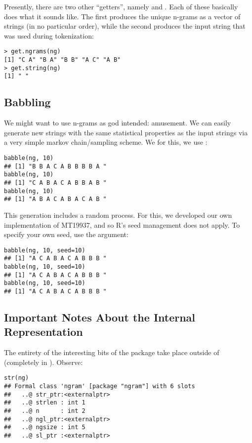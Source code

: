 Presently, there are two other ``getters'', namely  and
.  Each of these basically does what it sounds like.
The first produces the unique n-grams as a vector of strings (in no particular 
order), while the second produces the input string that was used during 
tokenization:

\begin{lstlisting}[language=rr]
> get.ngrams(ng)
[1] "C A" "B A" "B B" "A C" "A B"
> get.string(ng)
[1] " "
\end{lstlisting}




\subsection{Babbling}

We might want to use n-grams as god intended:  amusement.  We can easily
generate new strings with the same statistical properties as the input strings
via a very simple markov chain/sampling scheme.  We for this, we use 
:

\begin{lstlisting}[language=rr]
babble(ng, 10)
## [1] "B B A C A B B B B A "
babble(ng, 10)
## [1] "C A B A C A B B A B "
babble(ng, 10)
## [1] "A B A C A B A C A B "
\end{lstlisting}

This generation includes a random process.  For this, we developed our own
implementation of MT19937, and so R's seed management does not apply.  To 
specify your own seed, use the  argument:

\begin{lstlisting}[language=rr]
babble(ng, 10, seed=10)
## [1] "A C A B A C A B B B "
babble(ng, 10, seed=10)
## [1] "A C A B A C A B B B "
babble(ng, 10, seed=10)
## [1] "A C A B A C A B B B "
\end{lstlisting}



\subsection{Important Notes About the Internal Representation}

The entirety of the interesting bits of the \thispackage package take place 
outside of \R (completely in \C).  Observe:

\begin{lstlisting}[language=rr]
str(ng)
## Formal class 'ngram' [package "ngram"] with 6 slots
##   ..@ str_ptr:<externalptr> 
##   ..@ strlen : int 1
##   ..@ n      : int 2
##   ..@ ngl_ptr:<externalptr> 
##   ..@ ngsize : int 5
##   ..@ sl_ptr :<externalptr> 
\end{lstlisting}

